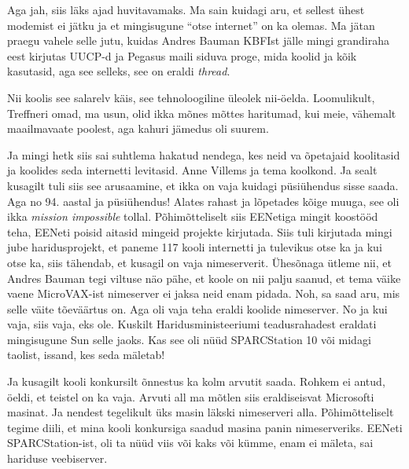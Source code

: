 Aga jah, siis läks ajad huvitavamaks. Ma sain kuidagi aru, et sellest ühest modemist ei jätku ja et mingisugune \enquote{otse internet} on ka olemas. Ma jätan praegu vahele selle jutu, kuidas Andres Bauman KBFIst jälle mingi grandiraha eest kirjutas UUCP-d ja Pegasus maili siduva proge, mida koolid ja kõik kasutasid, aga see selleks, see on eraldi \emph{thread}. 

Nii koolis see salarelv käis, see tehnoloogiline üleolek nii-öelda. Loomulikult, Treffneri omad, ma usun, olid ikka mõnes mõttes haritumad, kui meie, vähemalt maailmavaate poolest, aga kahuri jämedus oli suurem. 

Ja mingi hetk siis sai suhtlema hakatud nendega, kes neid va õpetajaid koolitasid ja koolides seda internetti levitasid. Anne Villems ja tema  koolkond. Ja sealt kusagilt tuli siis see arusaamine, et ikka on vaja kuidagi püsiühendus sisse saada. Aga no 94. aastal ja püsiühendus! Alates rahast ja lõpetades kõige muuga, see oli ikka \emph{mission impossible} tollal. Põhimõtteliselt siis EENetiga mingit koostööd teha, EENeti poisid aitasid mingeid projekte kirjutada. Siis tuli kirjutada mingi jube haridusprojekt, et paneme 117 kooli internetti ja tulevikus otse ka ja kui otse ka, siis tähendab, et kusagil on vaja nimeserverit. Ühesõnaga ütleme nii, et Andres Bauman tegi viltuse näo pähe, et koole on nii palju saanud, et tema väike vaene MicroVAX-ist nimeserver ei jaksa neid enam pidada. Noh, sa saad aru, mis selle väite tõeväärtus on. Aga oli vaja teha eraldi koolide nimeserver. No ja kui vaja, siis vaja, eks ole. Kuskilt Haridusministeeriumi teadusrahadest eraldati mingisugune Sun selle jaoks. Kas see oli nüüd SPARCStation 10 või midagi taolist, issand, kes seda mäletab! 

Ja kusagilt kooli konkursilt õnnestus ka kolm arvutit saada. Rohkem ei antud, öeldi, et teistel on ka vaja. Arvuti all ma  mõtlen siis eraldiseisvat Microsofti masinat. Ja nendest  tegelikult üks masin läkski nimeserveri alla. Põhimõtteliselt tegime diili, et mina kooli konkursiga saadud masina panin nimeserveriks. EENeti SPARCStation-ist, oli ta nüüd viis või kaks või kümme, enam ei mäleta, sai hariduse veebiserver. 

